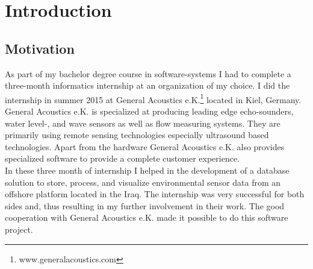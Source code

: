 \chapter{Introduction}

\section{Motivation}
As part of my bachelor degree course in software-systems I had to complete a three-month informatics internship at an organization of my choice. I did the internship in summer 2015 at General Acoustics e.K.\footnote{\label{foot:1} www.generalacoustics.com} located in Kiel, Germany. General Acoustics e.K. is specialized at producing leading edge echo-sounders, water level-, and wave sensors as well as flow measuring systems. They are primarily using remote sensing technologies especially ultrasound based technologies. Apart from the hardware General Acoustics e.K. also provides specialized software to provide a complete customer experience.\\
In these three month of internship I helped in the development of a database solution to store, process, and visualize environmental sensor data from an offshore platform located in the Iraq. The internship was very successful for both sides and, thus resulting in my further involvement in their work. The good cooperation with General Acoustics e.K. made it possible to do this software project.%


